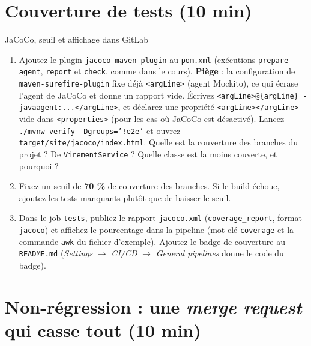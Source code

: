 \documentclass[11pt]{article}
\begin{document}
\section{Couverture de tests (10 min)}

\begin{exobox}{JaCoCo, seuil et affichage dans GitLab}
\begin{enumerate}[leftmargin=1.4em]
  \item Ajoutez le plugin \texttt{jacoco-maven-plugin} au \texttt{pom.xml} (exécutions \texttt{prepare-agent}, \texttt{report} et \texttt{check}, comme dans le cours).
  \textbf{Piège} : la configuration de \texttt{maven-surefire-plugin} fixe déjà \texttt{<argLine>} (agent Mockito), ce qui écrase l'agent de JaCoCo et donne un rapport vide. Écrivez \texttt{<argLine>@\{argLine\} -javaagent:...</argLine>}, et déclarez une propriété \texttt{<argLine></argLine>} vide dans \texttt{<properties>} (pour les cas où JaCoCo est désactivé). Lancez \texttt{./mvnw verify -Dgroups='!e2e'} et ouvrez \texttt{target/site/jacoco/index.html}. Quelle est la couverture des branches du projet ? De \texttt{VirementService} ? Quelle classe est la moins couverte, et pourquoi ?
  \item Fixez un seuil de \textbf{70 \%} de couverture des branches. Si le build échoue, ajoutez les tests manquants plutôt que de baisser le seuil.
  \item Dans le job \texttt{tests}, publiez le rapport \texttt{jacoco.xml} (\texttt{coverage\_report}, format \texttt{jacoco}) et affichez le pourcentage dans la pipeline (mot-clé \texttt{coverage} et la commande \texttt{awk} du fichier d'exemple). Ajoutez le badge de couverture au \texttt{README.md} (\textit{Settings} $\rightarrow$ \textit{CI/CD} $\rightarrow$ \textit{General pipelines} donne le code du badge).
\end{enumerate}
\end{exobox}

\section{Non-régression : une \textit{merge request} qui casse tout (10 min)}
\end{document}
